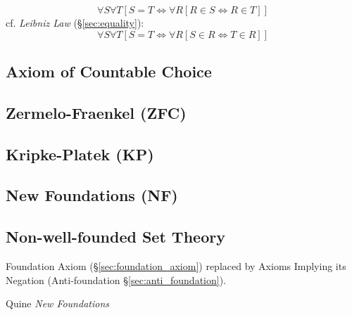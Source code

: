 \[
  \forall S \forall T
    [S = T \Leftrightarrow \forall R [ R \in S \Leftrightarrow R \in T ]]
\]
cf. \emph{Leibniz Law} (\S\ref{sec:equality}):
\[
  \forall S \forall T
    [S = T \Leftrightarrow \forall R [ S \in R \Leftrightarrow T \in R ]]
\]


\subsection{Axiom of Countable Choice}\label{sec:countable_choice}

\subsection{Zermelo-Fraenkel (ZFC)}\label{sec:zermelo_fraenkel}


\subsection{Kripke-Platek (KP)}\label{sec:kripke_platek}

\subsection{New Foundations (NF)}\label{sec:quine_foundations}

\subsection{Non-well-founded Set Theory}\label{sec:non_wellfounded}

\cite{aczel88}

Foundation Axiom (\S\ref{sec:foundation_axiom}) replaced by Axioms
Implying its Negation (Anti-foundation \S\ref{sec:anti_foundation}).

Quine \emph{New Foundations}


